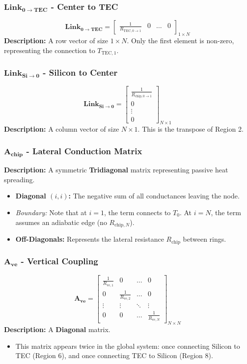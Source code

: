 \documentclass[10pt,a4paper,twocolumn]{article}
\begin{document}
\subsubsection{$\mathbf{Link_{0 \to TEC}}$ - Center to TEC}
$$ \mathbf{Link_{0 \to TEC}} = \begin{bmatrix} \frac{1}{R_{\text{TEC}, 0\to 1}} & 0 & \dots & 0 \end{bmatrix}_{1 \times N} $$
\textbf{Description:} A row vector of size $1 \times N$. Only the first element is non-zero, representing the connection to $T_{\text{TEC},1}$.

\subsubsection{$\mathbf{Link_{Si \to 0}}$ - Silicon to Center}
$$ \mathbf{Link_{Si \to 0}} = \begin{bmatrix} \frac{1}{R_{\text{chip}, 0\to 1}} \\ 0 \\ \vdots \\ 0 \end{bmatrix}_{N \times 1} $$
\textbf{Description:} A column vector of size $N \times 1$. This is the transpose of Region 2.

\subsubsection{$\mathbf{A_{chip}}$ - Lateral Conduction Matrix}
\textbf{Description:} A symmetric \textbf{Tridiagonal} matrix representing passive heat spreading.
\begin{itemize}
	\item \textbf{Diagonal $(i,i)$:} The negative sum of all conductances leaving the node.
	\item \textit{Boundary:} Note that at $i=1$, the term connects to $T_0$. At $i=N$, the term assumes an adiabatic edge (no $R_{\text{chip},N}$).
	\item \textbf{Off-Diagonals:} Represents the lateral resistance $R_{\text{chip}}$ between rings.
\end{itemize}

\subsubsection{$\mathbf{A_{ve}}$ - Vertical Coupling}
$$ \mathbf{A_{ve}} = \begin{bmatrix} \frac{1}{R_{\text{ve},1}} & 0 & \dots & 0 \\ 0 & \frac{1}{R_{\text{ve},2}} & \dots & 0 \\ \vdots & \vdots & \ddots & \vdots \\ 0 & 0 & \dots & \frac{1}{R_{\text{ve},N}} \end{bmatrix}_{N \times N} $$
\textbf{Description:} A \textbf{Diagonal} matrix.
\begin{itemize}
	\item This matrix appears twice in the global system: once connecting Silicon to TEC (Region 6), and once connecting TEC to Silicon (Region 8).
\end{itemize}
\end{document}
